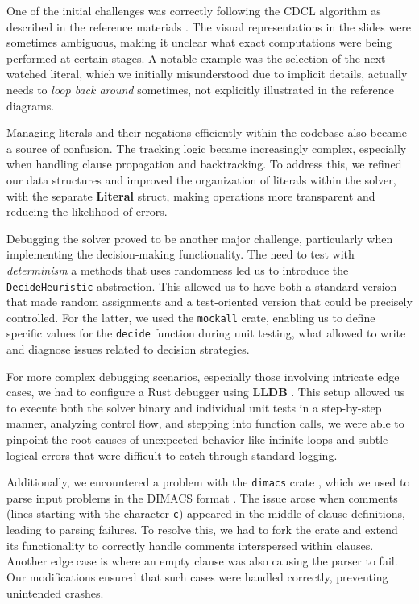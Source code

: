 \documentclass[a4paper,12pt]{article}
\begin{document}
One of the initial challenges was correctly following the CDCL algorithm as described in the
reference materials \cite{CdclAlgorithm}. The visual representations in the slides were
sometimes ambiguous, making it unclear what exact computations were being performed at certain
stages. A notable example was the selection of the next watched literal, which we initially
misunderstood due to implicit details, actually needs to \textit{loop back around} sometimes,
not explicitly illustrated in the reference diagrams.

Managing literals and their negations efficiently within the codebase also became a source of
confusion. The tracking logic became increasingly complex, especially when handling clause
propagation and backtracking. To address this, we refined our data structures and improved
the organization of literals within the solver, with the separate \textbf{Literal} struct,
making operations more transparent and reducing the likelihood of errors.

Debugging the solver proved to be another major challenge, particularly when implementing the
decision-making functionality. The need to test with \textit{determinism} a methods that uses
randomness led us to introduce the \texttt{DecideHeuristic} abstraction. This allowed us to
have both a standard version that made random assignments and a test-oriented version that could
be precisely controlled. For the latter, we used the \texttt{mockall} crate, enabling us to
define specific values for the \texttt{decide} function during unit testing, what allowed to
write and diagnose issues related to decision strategies.

For more complex debugging scenarios, especially those involving intricate edge cases, we had
to configure a Rust debugger using \textbf{LLDB} \cite{LLDB}. This setup allowed us to execute
both the solver binary and individual unit tests in a step-by-step manner, analyzing control flow,
and stepping into function calls, we were able to pinpoint the root causes of unexpected behavior
like infinite loops and subtle logical errors that were difficult to catch through standard logging.

Additionally, we encountered a problem with the \texttt{dimacs} crate \cite{DimacsCrate}, which
we used to parse input problems in the DIMACS format \cite{DimacsFormat}. The issue arose when
comments (lines starting with the character \texttt{c}) appeared in the middle of clause definitions,
leading to parsing failures.
To resolve this, we had to fork the crate and extend its functionality to correctly handle comments
interspersed within clauses. Another edge case is where an empty clause was also causing the parser
to fail. Our modifications ensured that such cases were handled correctly, preventing unintended
crashes.
\end{document}
